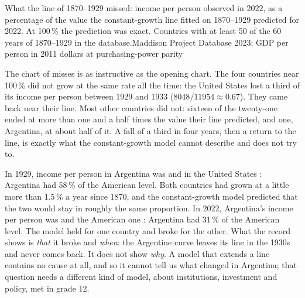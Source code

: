 \begin{omchart}{What the line of 1870--1929 missed: income per person observed in 2022, as a
percentage of the value the constant-growth line fitted on 1870--1929 predicted for 2022. At 100\,\%
the prediction was exact. Countries with at least 50 of the 60 years of 1870--1929 in the
database.}{Maddison Project Database 2023; GDP per person in 2011 dollars at purchasing-power parity}
\end{omchart}

The chart of misses is as instructive as the opening chart. The four countries near 100\,\% did
not grow at the same rate all the time: the United States lost a third of its income per person
between 1929 and 1933 ($8048 / 11954 \approx 0.67$). They came back near their line. Most other countries did not: sixteen of
the twenty-one ended at more than one and a half times the value their line predicted, and one,
Argentina, at about half of it.
A fall of a third in four years, then a return to the line, is exactly what the constant-growth
model cannot describe and does not try to.

\begin{record}[A forecast that held, and one that did not]
In 1929, income per person in Argentina was  and in the United States :
Argentina had 58\,\% of the American level. Both countries had grown at a little more than
1.5\,\% a year since 1870, and the constant-growth model predicted that the two would stay in
roughly the same proportion. In 2022, Argentina's income per person was  and the
American one : Argentina had 31\,\% of the American level. The model held for one
country and broke for the other. What the record shows is \emph{that} it broke and \emph{when}:
the Argentine curve leaves its line in the 1930s and never comes back. It does not show
\emph{why}. A model that extends a line contains no cause at all, and so it cannot tell us what
changed in Argentina; that question needs a different kind of model, about institutions,
investment and policy, met in grade 12.
\end{record}

